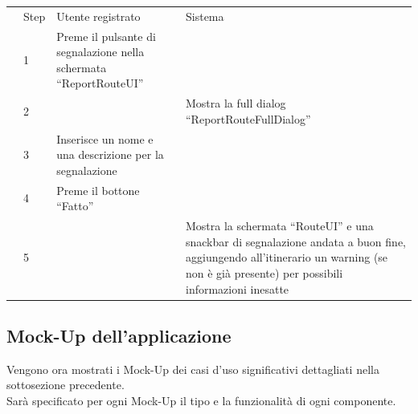 \documentclass{natourDoc}
\begin{document}
\begin{tabularx}{\linewidth}{|l| p{1cm} | p{4cm} | X |}
	\hline
	\multirow{2}{*}{}
	                              & Step                                                 & Utente registrato                                                 & Sistema                                                                          \\

	\cline{2-4}                   & 1                                                    & Preme il pulsante di segnalazione nella schermata “ReportRouteUI” &                                                                                  \\

	\cline{2-4}                   & 2                                                    &                                                                   & Mostra la full dialog “ReportRouteFullDialog”                                    \\

	\cline{2-4}                   & 3                                                    & Inserisce un nome e una descrizione per la segnalazione           &                                                                                  \\

	\cline{2-4}                   & 4                                                    & Preme il bottone “Fatto”                                          &                                                                                  \\

	\cline{2-4}                   & 5                                                    &                                                                   & Mostra la schermata “RouteUI” e una snackbar di segnalazione andata a buon fine,
	aggiungendo all’itinerario un warning (se non è già presente) per possibili informazioni inesatte                                                                                                                                           \\

	\hline
\end{tabularx}

\newpage

\subsection{Mock-Up dell'applicazione}
Vengono ora mostrati i Mock-Up dei casi d'uso significativi dettagliati nella sottosezione precedente.\\
Sarà specificato per ogni Mock-Up il tipo e la funzionalità di ogni componente.
\end{document}
